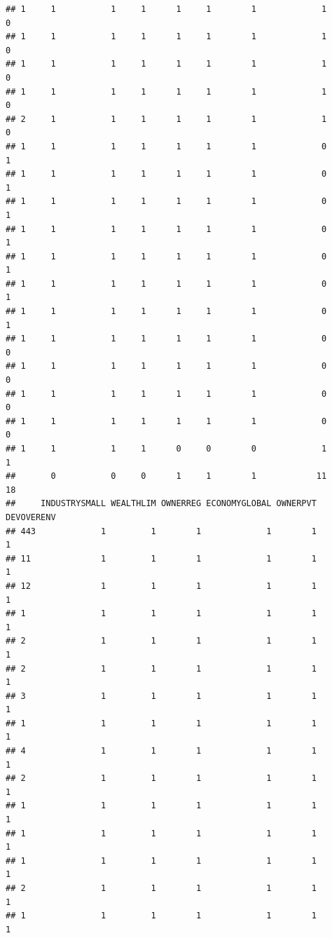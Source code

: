 \documentclass[
]{article}
\begin{document}
\begin{verbatim}
## 1     1           1     1      1     1        1             1             0
## 1     1           1     1      1     1        1             1             0
## 1     1           1     1      1     1        1             1             0
## 1     1           1     1      1     1        1             1             0
## 2     1           1     1      1     1        1             1             0
## 1     1           1     1      1     1        1             0             1
## 1     1           1     1      1     1        1             0             1
## 1     1           1     1      1     1        1             0             1
## 1     1           1     1      1     1        1             0             1
## 1     1           1     1      1     1        1             0             1
## 1     1           1     1      1     1        1             0             1
## 1     1           1     1      1     1        1             0             1
## 1     1           1     1      1     1        1             0             0
## 1     1           1     1      1     1        1             0             0
## 1     1           1     1      1     1        1             0             0
## 1     1           1     1      1     1        1             0             0
## 1     1           1     1      0     0        0             1             1
##       0           0     0      1     1        1            11            18
##     INDUSTRYSMALL WEALTHLIM OWNERREG ECONOMYGLOBAL OWNERPVT DEVOVERENV
## 443             1         1        1             1        1          1
## 11              1         1        1             1        1          1
## 12              1         1        1             1        1          1
## 1               1         1        1             1        1          1
## 2               1         1        1             1        1          1
## 2               1         1        1             1        1          1
## 3               1         1        1             1        1          1
## 1               1         1        1             1        1          1
## 4               1         1        1             1        1          1
## 2               1         1        1             1        1          1
## 1               1         1        1             1        1          1
## 1               1         1        1             1        1          1
## 1               1         1        1             1        1          1
## 2               1         1        1             1        1          1
## 1               1         1        1             1        1          1

\end{verbatim}
\end{document}
